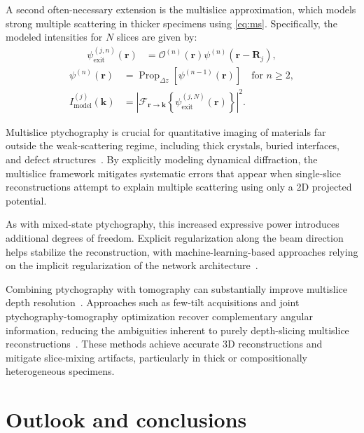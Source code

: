 \documentclass[pdflatex,sn-aps,iicol]{sn-jnl}%
\begin{document}
A second often-necessary extension is the multislice approximation, which models strong multiple scattering in thicker specimens using \cref{eq:ms}.
Specifically, the modeled intensities for $N$ slices are given by:
\begin{align}
\psi_{\text{exit}}^{(j,n)}(\boldsymbol{r})
&=
\mathcal{O}^{(n)}(\boldsymbol{r})
\psi^{(n)}(\boldsymbol{r}-\boldsymbol{R}_j),
\label{eq:multi-slice-01}
\end{align}
\begin{align}
\psi^{(n)}(\boldsymbol{r})
&=
\operatorname{Prop}_{\Delta z}
\left[
\psi^{(n-1)}(\boldsymbol{r})
\right]
\quad \text{for } n \geq 2,\\
I_{\text{model}}^{(j)}(\boldsymbol{k})
&=
\left\lvert
\mathcal{F}_{\boldsymbol{r}\to\boldsymbol{k}}
\left\{
\psi_{\text{exit}}^{(j,N)}(\boldsymbol{r})
\right\}
\right\rvert^2.
\label{eq:multi-slice-02}
\end{align}

Multislice ptychography is crucial for quantitative imaging of materials far outside the weak-scattering regime, including thick crystals, buried interfaces, and defect structures~\cite{Ribet_2024}.
By explicitly modeling dynamical diffraction, the multislice framework mitigates systematic errors that appear when single-slice reconstructions attempt to explain multiple scattering using only a 2D projected potential.

As with mixed-state ptychography, this increased expressive power introduces additional degrees of freedom.
Explicit regularization along the beam direction helps stabilize the reconstruction, with machine-learning-based approaches relying on the implicit regularization of the network architecture~\cite{McCray_2025}.

Combining ptychography with tomography can substantially improve multislice depth resolution~\cite{chen2024imaging,allars2025depth}.
Approaches such as few-tilt acquisitions and joint ptychography-tomography optimization recover complementary angular information, reducing the ambiguities inherent to purely depth-slicing multislice reconstructions~\cite{Lee_2023,You_2024,Dong_2025}.
These methods achieve accurate 3D reconstructions and mitigate slice-mixing artifacts, particularly in thick or compositionally heterogeneous specimens.

\section*{Outlook and conclusions}
\end{document}
